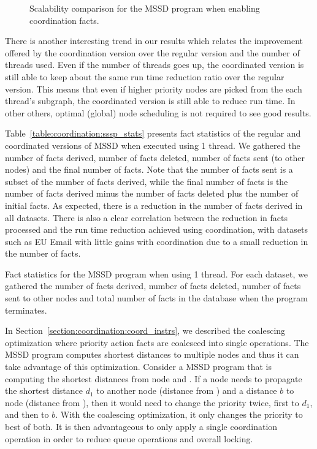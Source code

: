\begin{figure}[]
        \caption{Scalability comparison for the MSSD program when enabling
        coordination facts.}

        \label{fig:coordination:results_sssp}
\end{figure}

There is another interesting trend in our results which relates the improvement
offered by the coordination version over the regular version and the number of
threads used. Even if the number of threads goes up, the coordinated version is
still able to keep about the same run time reduction ratio over the regular
version. This means that even if higher priority nodes are picked from the each
thread's subgraph, the coordinated version is still able to reduce run time. In
other others, optimal (global) node scheduling is not required to see good
results.

Table~\ref{table:coordination:sssp_stats} presents fact statistics of the
regular and coordinated versions of MSSD when executed using 1 thread. We
gathered the number of facts derived, number of facts deleted, number of facts
sent (to other nodes) and the final number of facts. Note that the number of
facts sent is a subset of the number of facts derived, while the final number of
facts is the number of facts derived minus the number of facts deleted plus the
number of initial facts. As expected, there is a reduction in the number of
facts derived in all datasets. There is also a clear correlation between the
reduction in facts processed and the run time reduction achieved using
coordination, with datasets such as EU Email with little gains with coordination
due to a small reduction in the number of facts.

\begin{table}[ht]
   \begin{center}
      
   \end{center}

   \caption{Fact statistics for the MSSD program when using 1 thread. For each
      dataset, we gathered the number of facts derived, number of facts deleted,
      number of facts sent to other nodes and total number of facts in the
      database when the program terminates.}

   \label{table:coordination:sssp_stats}
\end{table}

In Section~\ref{section:coordination:coord_instrs}, we described the coalescing
optimization where priority action facts are coalesced into single operations.
The MSSD program computes shortest distances to multiple nodes and thus it can
take advantage of this optimization. Consider a MSSD program that is computing
the shortest distances from node  and . If a node 
needs to propagate the shortest distance $d_1$ to another node  (distance
from ) and a distance $b$ to node  (distance from ),
then it would need to change the priority twice, first to $d_1$, and then to $b$.
With the coalescing optimization, it only changes the priority to best of both.
It is then advantageous to only apply a single coordination operation
in order to reduce queue operations and overall locking.


